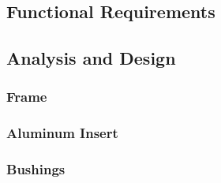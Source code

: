 \subsection{Functional Requirements}

\subsection{Analysis and Design}
\subsubsection{Frame}
\subsubsection{Aluminum Insert}
\subsubsection{Bushings}